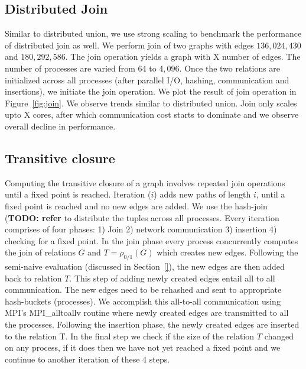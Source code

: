 


\subsection{Distributed Join}
\label{sec:join}
Similar to distributed union, we use strong scaling to benchmark the performance of distributed join as well.
We perform join of two graphs with edges $136,024,430$ and $180,292,586$. The join operation yields a graph with X number of edges.
The number of processes are varied from $64$ to $4,096$. 
Once the two relations are initialized across all processes (after parallel I/O, hashing, communication and insertions), we initiate the join operation. 
We plot the result of join operation in Figure~\ref{fig:join}. We observe trends similar to distributed union.
Join only scales upto X cores, after which communication cost starts to dominate and we observe overall decline in performance.


\subsection{Transitive closure}
\label{sec:tc}

Computing the transitive closure of a graph involves repeated join operations until a fixed point is reached. 
Iteration ($i$) adds new paths of length $i$, until a fixed point is reached and no new edges are added.
We use the hash-join (\textbf{TODO: refer} to distribute the tuples across all processes.
Every iteration comprises of four phases: 1) Join 2) network communication 3) insertion 4) checking for a
fixed point. In the join phase every process concurrently computes the join of relations $G$ and $T = \rho_{0 / 1}(G)$ which creates new edges. Following the semi-naive evaluation (discussed in Section~\ref{}), the new edges are then added back to relation $T$. This step of adding newly created edges entail all to all communication. The new edges need to be rehashed and sent to appropriate hash-buckets (processes). 
We accomplish this all-to-all communication using MPI’s MPI\_alltoallv routine where newly created edges are transmitted to all the processes.
Following the insertion phase, the newly created edges are inserted to the relation T.
In the final step we check if the size of the relation $T$ changed on any process, if it does then we have not yet reached a fixed point and we continue to
another iteration of these 4 steps.


